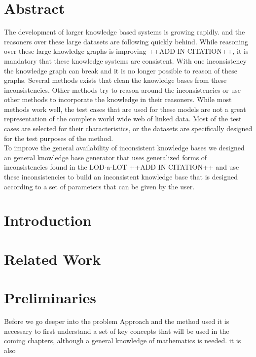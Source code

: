 \documentclass{article}
\begin{document}
\section*{Abstract}
The development of larger knowledge based systems is growing rapidly. and the reasoners over these large datasets are following quickly behind. While reasoning over these large knowledge graphs is improving ++ADD IN CITATION++, it is mandatory that these knowledge systems are consistent. With one inconsistency the knowledge graph can break and it is no longer possible to reason of these graphs. Several methods exists that clean the knowledge bases from these inconsistencies. Other methods try to reason around the inconsistencies or use other methods to incorporate the knowledge in their reasoners. While most methods work well, the test cases that are used for these models are not a great representation of the complete world wide web of linked data. Most of the test cases are selected for their characteristics, or the datasets are specifically designed for the test purposes of the method.\\
To improve the general availability of inconsistent knowledge bases we designed an general knowledge base generator that uses generalized forms of inconsistencies found in the LOD-a-LOT ++ADD IN CITATION++ and use these inconsistencies to build an inconsistent knowledge base that is designed according to a set of parameters that can be given by the user.\\


\newpage
\tableofcontents
\newpage
{}

\section{Introduction}


\newpage
\section{Related Work}



\newpage
\section{Preliminaries}
Before we go deeper into the problem Approach and the method used it is necessary to first understand a set of key concepts that will be used in the coming chapters, although a general knowledge of mathematics is needed. it is also 
\end{document}
